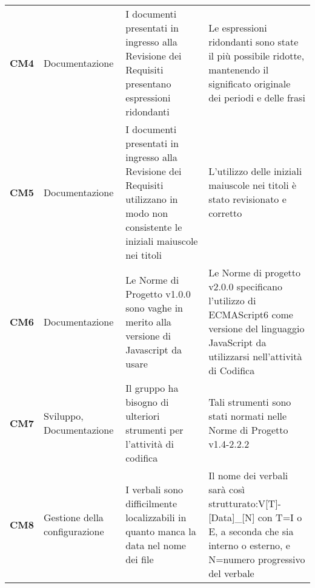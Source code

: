 \documentclass[../piano-di-qualifica.tex]{subfiles}
\begin{document}
\begin{longtable}[H]{>{\centering\bfseries}m{2.5cm} >{\centering}m{2.5cm} >{\centering}m{5.5cm} >{\centering\arraybackslash}m{5.5cm}}
CM4  & Documentazione                                & I documenti presentati in ingresso alla Revisione dei Requisiti presentano espressioni ridondanti                                                                             & Le espressioni ridondanti sono state il più possibile ridotte, mantenendo il significato originale dei periodi e delle frasi                                                                                                                                                                                                                        \\
CM5  & Documentazione                                & I documenti presentati in ingresso alla Revisione dei Requisiti utilizzano in modo non consistente le iniziali maiuscole nei titoli                                           & L’utilizzo delle iniziali maiuscole nei titoli è stato revisionato e corretto                                                                                                                                                                                                                                                                       \\
CM6  & Documentazione                                & Le Norme di Progetto v1.0.0 sono vaghe in merito alla versione di Javascript da usare                                                                                         & Le Norme di progetto v2.0.0 specificano l’utilizzo di ECMAScript6 come versione del linguaggio JavaScript da utilizzarsi nell’attività di Codifica                                                                                                                                                                                                  \\
CM7  & Sviluppo, Documentazione                      & Il gruppo ha bisogno di ulteriori strumenti per l’attività di codifica                                                                                                        & Tali strumenti sono stati normati nelle Norme di Progetto v1.4-2.2.2                                                                                                                                                                                                                                                                                \\
CM8  & Gestione della configurazione                 & I verbali sono difficilmente localizzabili in quanto manca la data nel nome dei file                                                                                          & Il nome dei verbali sarà così strutturato:V{[}T{]}-{[}Data{]}\_{[}N{]} con T=I o E, a seconda che sia interno o esterno, e N=numero progressivo del verbale                                                                                                                                                                                         \\

\end{longtable}
\end{document}
